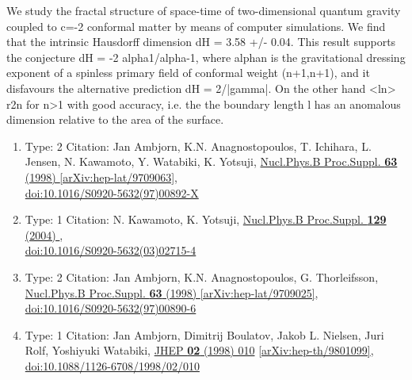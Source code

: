 \documentclass[a4paper,10pt]{article}
\begin{document}
\begin{enumerate}
We study the fractal structure of space-time of two-dimensional quantum gravity coupled to c=-2 conformal matter by means of computer simulations. We find that the intrinsic Hausdorff dimension dH = 3.58 +/- 0.04. This result supports the conjecture dH = -2 alpha1/alpha{-1}, where alphan is the gravitational dressing exponent of a spinless primary field of conformal weight (n+1,n+1), and it disfavours the alternative prediction dH = 2/|gamma|. On the other hand <ln> ~ r{2n} for n>1 with good accuracy, i.e. the the boundary length l has an anomalous dimension relative to the area of the surface.
\begin{enumerate}
  \item Type: 2 Citation: Jan Ambjorn, K.N. Anagnostopoulos, T. Ichihara, L. Jensen, N. Kawamoto, Y. Watabiki, K. Yotsuji, \href{https://www.doi.org/10.1016/S0920-5632(97)00892-X}{Nucl.Phys.B Proc.Suppl. {\bf 63} (1998) }  \href{https://arxiv.org/abs/hep-lat/9709063}{[arXiv:hep-lat/9709063]},\\\href{https://www.doi.org/10.1016/S0920-5632(97)00892-X}{doi:10.1016/S0920-5632(97)00892-X}
  \item Type: 1 Citation: N. Kawamoto, K. Yotsuji, \href{https://www.doi.org/10.1016/S0920-5632(03)02715-4}{Nucl.Phys.B Proc.Suppl. {\bf 129} (2004) },\\\href{https://www.doi.org/10.1016/S0920-5632(03)02715-4}{doi:10.1016/S0920-5632(03)02715-4}
  \item Type: 2 Citation: Jan Ambjorn, K.N. Anagnostopoulos, G. Thorleifsson, \href{https://www.doi.org/10.1016/S0920-5632(97)00890-6}{Nucl.Phys.B Proc.Suppl. {\bf 63} (1998) }  \href{https://arxiv.org/abs/hep-lat/9709025}{[arXiv:hep-lat/9709025]},\\\href{https://www.doi.org/10.1016/S0920-5632(97)00890-6}{doi:10.1016/S0920-5632(97)00890-6}
  \item Type: 1 Citation: Jan Ambjorn, Dimitrij Boulatov, Jakob L. Nielsen, Juri Rolf, Yoshiyuki Watabiki, \href{https://www.doi.org/10.1088/1126-6708/1998/02/010}{JHEP {\bf 02} (1998) 010}  \href{https://arxiv.org/abs/hep-th/9801099}{[arXiv:hep-th/9801099]},\\\href{https://www.doi.org/10.1088/1126-6708/1998/02/010}{doi:10.1088/1126-6708/1998/02/010}

\end{enumerate}
\end{enumerate}
\end{document}
